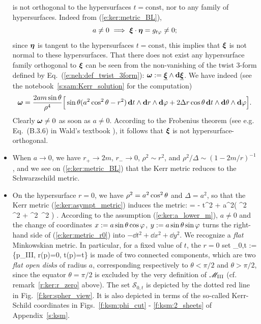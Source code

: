 \begin{itemize}
is not orthogonal to the hypersurfaces $t=\mathrm{const}$, nor to any family of hypersurfaces.
Indeed from (\ref{e:ker:metric_BL}),
\[
    a\not=0 \ \Longrightarrow \ \bm{\xi}\cdot\bm{\eta} = g_{t\varphi} \not=0 ;
\]
since $\bm{\eta}$ is tangent to the hypersurfaces $t=\mathrm{const}$, this implies
that $\bm{\xi}$ is not normal to these hypersurfaces. That there does not exist any hypersurface
family orthogonal to $\bm{\xi}$ can be seen from the non-vanishing of the twist 3-form defined by Eq.~(\ref{e:neh:def_twist_3form}):
$\bm{\omega} := \underline{\bm{\xi}}\wedge \mathbf{d}\underline{\bm{\xi}}$. We have indeed (see the notebook~\ref{s:sam:Kerr_solution} for the computation)
\[
    \bm{\omega} = \frac{2 a m \sin\theta}{\rho^4} \Big[
        \sin\theta (a^2\cos^2\theta - r^2) \, \mathbf{d} t \wedge \mathbf{d} r \wedge \mathbf{d} \varphi
        + 2 \Delta r \cos\theta \, \mathbf{d} t \wedge \mathbf{d} \theta \wedge \mathbf{d} \varphi \Big] .
\]
Clearly $\bm{\omega} \neq 0$ as soon as $a\neq 0$. According to the
Frobenius theorem (see e.g.
Eq.~(B.3.6) in Wald's textbook \cite{Wald84}), it follows that
$\bm{\xi}$ is not hypersurface-orthogonal.
\item When $a\rightarrow 0$, we have $r_+\rightarrow 2m$, $r_-\rightarrow 0$,
$\rho^2\sim r^2$, and $\rho^2/\Delta \sim (1-2m/r)^{-1}$, and we see on
(\ref{e:ker:metric_BL}) that the Kerr metric reduces to the Schwarzschild metric.
\item On the hypersurface $r=0$, we have $\rho^2=a^2\cos^2\theta$ and $\Delta=a^2$, so that the Kerr metric (\ref{e:ker:asympt_metric}) induces the metric:
\be \label{e:ker:metric_r0}
     = - \dd t^2 + a^2\left( \cos^2\th \,  \dd \th^2 + \sin^2\th \, \dd \ph^2 \right) .
\ee
According to the assumption (\ref{e:ker:a_lower_m}), $a\not=0$
and the change of coordinates  $x:=a\sin\theta\cos\varphi$, $y:=a\sin\theta\sin\varphi$
turns the right-hand side of (\ref{e:ker:metric_r0}) into $- \dd t^2 + \dd x^2 + \dd y^2$.
We recognize a \emph{flat} Minkowskian metric. In particular, for a fixed value
of $t$, the $r=0$ set
\be \label{e:ker:S_r_zero}
    _{0,t} := \{p\in \M_{\rm III}, r(p)=0, t(p)=t\}
\ee
is made of two connected components, which are two \emph{flat open disks} of radius $a$, corresponding respectively to $\theta < \pi/2$ and $\theta>\pi/2$, since
the equator $\theta=\pi/2$ is excluded by the very definition of $\mathscr{M}_{\rm III}$
(cf. remark~\ref{r:ker:r_zero} above). The set $\mathcal{S}_{0,t}$ is depicted
by the dotted red line in Fig.~\ref{f:ker:spher_view}. It is also depicted
in terms of the so-called Kerr-Schild coordinates in
Figs.~\ref{f:ksm:phi_cut} - \ref{f:ksm:2_sheets} of Appendix~\ref{s:ksm}.
\end{itemize}

